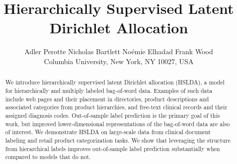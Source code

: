 \documentclass[portrait]{sciposter}
\title{{\Huge Hierarchically Supervised Latent Dirichlet Allocation}}
\author{
Adler Perotte\hspace{1cm} Nicholas Bartlett \hspace{1cm} No\'emie Elhadad \hspace{1cm} Frank Wood\\
Columbia University, New York, NY 10027, USA \\
}
\begin{document}

\maketitle
\begin{abstract}
\begin{center}
\parbox{70 cm}{
We introduce hierarchically supervised latent Dirichlet allocation (HSLDA), a
model for hierarchically and multiply labeled bag-of-word data.  Examples of
such data include web pages and their placement in directories, product
descriptions and associated categories from product hierarchies, and free-text
clinical records and their assigned diagnosis codes. Out-of-sample label
prediction is the primary goal of this work, but improved lower-dimensional
representations of the bag-of-word data are also of interest. We demonstrate HSLDA on large-scale data from clinical document labeling and
retail product categorization tasks. We show that leveraging the structure from
hierarchical labels improves out-of-sample label prediction substantially when
compared to models that do not. 
}
\end{center}
\end{abstract}
\end{document}

